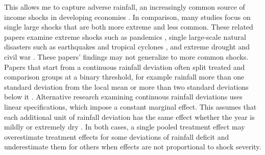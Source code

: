 This allows me to capture adverse rainfall, an increasingly common source of income shocks in developing economies \parencite{dinkelmanLongRunHealthRepercussions2017}. In comparison, many studies focus on single large shocks that are both more extreme and less common. These related papers examine extreme shocks such as pandemics \parencite{almond1918InfluenzaPandemic2006,kellyScourgeAsianFlu2011,beach1918InfluenzaPandemic2022}, single large-scale natural disasters such as earthquakes and tropical cyclones \parencite{carusoLongRunEffects2015,fujikiDisentanglingEffectsMultiple2015,deuchertTempestShortLongterm2015,dodlovaEffects2010Haiti2023}, and extreme drought and civil war \parencite{aldermanLongTermConsequences2006}. These papers' findings may not generalize to more common shocks. Papers that start from a continuous rainfall deviation often split treated and comparison groups at a binary threshold, for example rainfall more than one standard deviation from the local mean \parencite{skoufiasClimateVariabilityChild2012,adhvaryuHelpingChildrenCatch2024} or more than two standard deviations below it \parencite{hirvonenImpactEthiopias20152020,kudamatsuWeatherInfantMortality2012}. Alternative research examining continuous rainfall deviations uses linear specifications, which impose a constant marginal effect. This assumes that each additional unit of rainfall deviation has the same effect whether the year is mildly or extremely dry \parencite{macciniWeatherHealthSchooling2009,rochaWaterScarcityBirth2015}. In both cases, a single pooled treatment effect may overestimate treatment effects for some deviations of rainfall deficit and underestimate them for others when effects are not proportional to shock severity.

